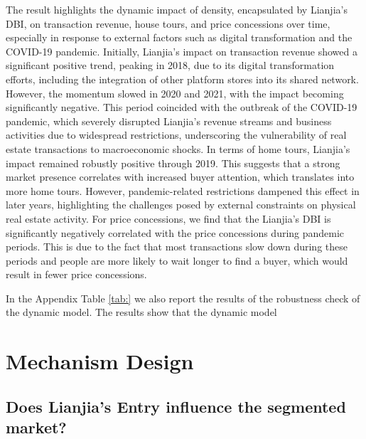 \documentclass[12pt]{article}
\begin{document}
The result highlights the dynamic impact of density, encapsulated by Lianjia's DBI, on transaction revenue, house tours, and price concessions over time, especially in response to external factors such as digital transformation and the COVID-19 pandemic. Initially, Lianjia's impact on transaction revenue showed a significant positive trend, peaking in 2018, due to its digital transformation efforts, including the integration of other platform stores into its shared network. However, the momentum slowed in 2020 and 2021, with the impact becoming significantly negative. This period coincided with the outbreak of the COVID-19 pandemic, which severely disrupted Lianjia's revenue streams and business activities due to widespread restrictions, underscoring the vulnerability of real estate transactions to macroeconomic shocks. In terms of home tours, Lianjia's impact remained robustly positive through 2019. This suggests that a strong market presence correlates with increased buyer attention, which translates into more home tours. However, pandemic-related restrictions dampened this effect in later years, highlighting the challenges posed by external constraints on physical real estate activity. For price concessions, we find that the Lianjia's DBI is significantly negatively correlated with the price concessions during pandemic periods. This is due to the fact that most transactions slow down during these periods and people are more likely to wait longer to find a buyer, which would result in fewer price concessions.

In the Appendix Table \ref{tab:} we also report the results of the robustness check of the dynamic model. The results show that the dynamic model 



\section{Mechanism Design} \label{sec:mechanism_design}

\subsection{Does Lianjia's Entry influence the segmented market?} \label{subsec:entry_effect}
\end{document}
